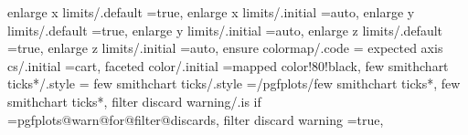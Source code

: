 {{{{{{{{{{{{enlarge x limits/.default                                          =true,                                                                                                                              
enlarge x limits/.initial                                          =auto,                                                                                                                              
enlarge y limits/.default                                          =true,                                                                                                                              
enlarge y limits/.initial                                          =auto,                                                                                                                              
enlarge z limits/.default                                          =true,                                                                                                                              
enlarge z limits/.initial                                          =auto,                                                                                                                              
ensure colormap/.code                                              ={%
expected axis cs/.initial                                         =cart,                                                                                                                              
faceted color/.initial                                             =mapped color!80!black,                                                                                                             
few smithchart ticks*/.style                                       ={                                                                                                                                  
few smithchart ticks/.style                                        ={/pgfplots/few smithchart ticks*},                                                                                                 
few smithchart ticks*,%
filter discard warning/.is if                                      =pgfplots@warn@for@filter@discards,                                                                                                 
filter discard warning                                             =true,                                                                                                                              
}}}}}}}}}}}}}}
